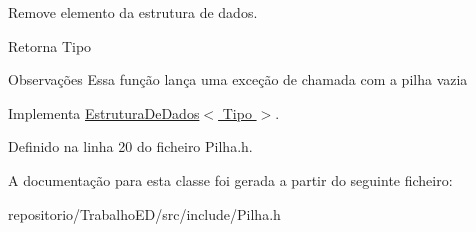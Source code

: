 Remove elemento da estrutura de dados. 

\begin{DoxyReturn}{Retorna}
Tipo
\end{DoxyReturn}
\begin{DoxyRemark}{Observações}
Essa função lança uma exceção de chamada com a pilha vazia 
\end{DoxyRemark}


Implementa \hyperlink{classEstruturaDeDados_a01ddc5aec2e4a425e4021055c15e7f02}{Estrutura\-De\-Dados$<$ Tipo $>$}.



Definido na linha 20 do ficheiro Pilha.\-h.



A documentação para esta classe foi gerada a partir do seguinte ficheiro\-:\begin{DoxyCompactItemize}
\item 
repositorio/\-Trabalho\-E\-D/src/include/Pilha.\-h\end{DoxyCompactItemize}
